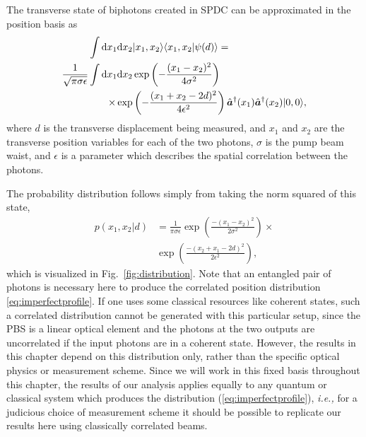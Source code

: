 The transverse state of biphotons created in SPDC can be approximated in the position basis as \cite{Schneeloch2015}
\begin{align}\label{eq:biphotonket}
\nonumber	\int  \text{d}x_1 \text{d}x_2 & \lvert x_1,x_2\rangle \langle x_1,x_2 \vert \psi(d) \rangle =  \\ 
\nonumber \frac{1}{\sqrt{\pi\sigma\epsilon}} \int \text{d}x_1 \text{d}x_2 & \exp\left(-\frac{(x_1 - x_2)^2}{4\sigma^2} \right) \\ 	
  \times \exp & \left(-\frac{(x_1 + x_2 - 2d)^2}{4\epsilon^2}\right) \hat{\bm a}^\dagger(x_1) \hat{\bm a}^\dagger(x_2)\lvert 0,0\rangle,
\end{align}
where $d$ is the transverse displacement being measured, and $x_1$ and $x_2$ are the transverse position variables for each of the two photons, $\sigma$ is the pump beam waist, and $\epsilon$ is a parameter which describes the spatial correlation between the photons.

The probability distribution follows simply from taking the norm squared of this state,
\begin{align}\label{eq:imperfectprofile}
\nonumber p({x_1,x_2}|d) &= \frac{1}{\pi\sigma\epsilon}\exp\left(\frac{-(x_{1} - x_{2})^2}{2\sigma^2}\right)\times \\
&\exp\left(\frac{-(x_{2} + x_{1} - 2d)^2}{2\epsilon^2}\right),
\end{align}
which is visualized in Fig.~\ref{fig:distribution}.
Note that an entangled pair of photons is necessary here to produce the correlated position distribution \eqref{eq:imperfectprofile}. If one uses some classical resources like coherent states, such a correlated distribution cannot be generated with this particular setup, since the PBS is a linear optical element and the photons at the two outputs are uncorrelated if the input photons are in a coherent state.
However, the results in this chapter depend on this distribution only, rather than the specific optical physics or measurement scheme.
Since we will work in this fixed basis throughout this chapter, the results of our analysis applies equally to any quantum or classical system which produces the distribution (\ref{eq:imperfectprofile}), \emph{i.e.,} for a judicious choice of measurement scheme it should be possible to replicate our results here using classically correlated beams.

